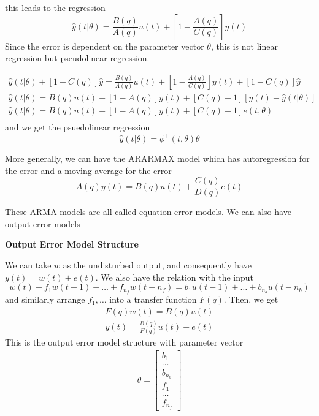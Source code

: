 this leads to the regression
\begin{equation}
    \hat{y}(t|\theta) = \frac{B(q)}{A(q)} u(t) + [1-\frac{A(q)}{C(q)}] y(t)
\end{equation}
Since the error is dependent on the parameter vector $\theta$, this is not linear regression but pseudolinear regression.

\begin{gather}
    \hat{y}(t|\theta) + [1-C(q)] \hat{y} = \frac{B(q)}{A(q)} u(t) + [1-\frac{A(q)}{C(q)}] y(t) + [1-C(q)] \hat{y} \\
    \hat{y}(t|\theta) = B(q) u(t) + [1-A(q)] y(t) + [C(q) - 1][y(t) - \hat{y}(t|\theta)] \\
    \hat{y}(t|\theta) = B(q) u(t) + [1-A(q)] y(t) + [C(q) - 1]e(t,\theta) \\
\end{gather} 
and we get the psuedolinear regression 
\begin{equation}
    \hat{y}(t|\theta) = \phi^\top(t,\theta) \theta
\end{equation}

More generally, we can have the ARARMAX model which has autoregression for the error and a moving average for the error
\begin{equation}
    A(q) y(t) = B(q) u(t) + \frac{C(q)}{D(q)}e(t)
\end{equation}

These ARMA models are all called equation-error models.
We can also have output error models

\textbf{Output Error Model Structure}

We can take $w$ as the undisturbed output, and consequently have $y(t) = w(t) + e(t)$.
We also have the relation with the input 
\begin{equation}
    w(t) + f_1 w(t-1) + \dots + f_{n_f} w(t-n_f) = b_1 u(t-1) + \dots + b_{n_b} u(t-n_b)
\end{equation}
and similarly arrange $f_1,\dots$ into a transfer function $F(q)$.
Then, we get
\begin{gather}
    F(q)w(t) = B(q)u(t) \\
    y(t) = \frac{B(q)}{F(q)} u(t) + e(t)
\end{gather}
This is the output error model structure with parameter vector
\begin{align}
    \theta = 
  \begin{bmatrix}
    b_1 \\ \dots \\ b_{n_b} \\ f_1 \\ \dots \\ f_{n_f}
  \end{bmatrix}
\end{align}

